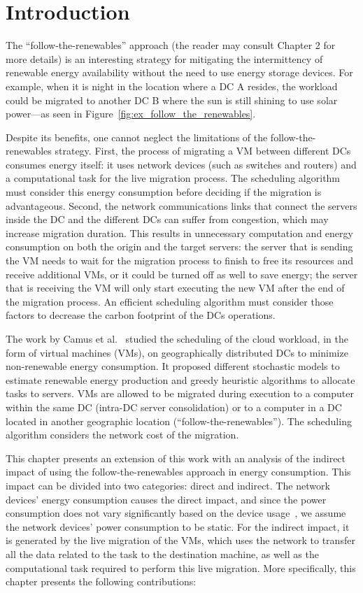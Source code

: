 \section{Introduction}

The ``follow-the-renewables'' approach (the reader may consult Chapter 2 for more details) is an interesting strategy for mitigating the intermittency of renewable energy availability without the need to use energy storage devices. For example, when it is night in the location where a DC A resides, the workload could be migrated to another DC B where the sun is still shining to use solar power---as seen in Figure~\ref{fig:ex_follow_the_renewables}.

Despite its benefits, one cannot neglect the limitations of the follow-the-renewables strategy. First, the process of migrating a VM between different DCs consumes energy itself: it uses network devices (such as switches and routers) and a computational task for the live migration process. The scheduling algorithm must consider this energy consumption before deciding if the migration is advantageous. Second, the network communications links that connect the servers inside the DC and the different DCs can suffer from congestion, which may increase migration duration. This results in unnecessary computation and energy consumption on both the origin and the target servers: the server that is sending the VM needs to wait for the migration process to finish to free its resources and receive additional VMs, or it could be turned off as well to save energy; the server that is receiving the VM will only start executing the new VM after the end of the migration process. An efficient scheduling algorithm must consider those factors to decrease the carbon footprint of the DCs operations.


The work by Camus et al.~\citet{SAGITTA,NEMESIS} studied the scheduling of the cloud workload, in the form of virtual machines (VMs), on geographically distributed DCs to minimize non-renewable energy consumption. It proposed different stochastic models to estimate renewable energy production and greedy heuristic algorithms to allocate tasks to servers. VMs are allowed to be migrated during execution to a computer within the same DC (intra-DC server consolidation)  or to a computer in a DC located in another geographic location (``follow-the-renewables''). The scheduling algorithm considers the network cost of the migration.


This chapter presents an extension of this work with an analysis of the indirect impact of using the follow-the-renewables approach in energy consumption. This impact can be divided into two categories: direct and indirect. The network devices' energy consumption causes the direct impact, and since the power consumption does not vary significantly based on the device usage~\cite{energy_network_devices}, we assume the network devices' power consumption to be static. For the indirect impact, it is generated by the live migration of the VMs, which uses the network to transfer all the data related to the task to the destination machine, as well as the computational task required to perform this live migration. More specifically, this chapter presents the following contributions:


